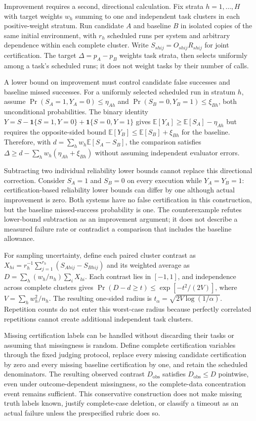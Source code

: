 \documentclass[11pt]{article}
\begin{document}
Improvement requires a second, directional calculation. Fix strata $h=1,\ldots,H$ with target weights $w_h$ summing to one and independent task clusters in each positive-weight stratum. Run candidate $A$ and baseline $B$ in isolated copies of the same initial environment, with $r_h$ scheduled runs per system and arbitrary dependence within each complete cluster. Write $S_{shij}=O_{shij}R_{shij}$ for joint certification. The target $\Delta=p_A-p_B$ weights task strata, then selects uniformly among a task\textquoteright{}s scheduled runs; it does not weight tasks by their number of calls.

A lower bound on improvement must control candidate false successes and baseline missed successes. For a uniformly selected scheduled run in stratum $h$, assume $\Pr(S_A=1,Y_A=0)\leq\eta_{Ah}$ and $\Pr(S_B=0,Y_B=1)\leq\xi_{Bh}$, both unconditional probabilities. The binary identity $Y=S-\mathbf{1}\{S=1,Y=0\}+\mathbf{1}\{S=0,Y=1\}$ gives $\mathbb{E}[Y_A]\geq\mathbb{E}[S_A]-\eta_{Ah}$ but requires the opposite-sided bound $\mathbb{E}[Y_B]\leq\mathbb{E}[S_B]+\xi_{Bh}$ for the baseline. Therefore, with $d=\sum_h w_h\mathbb{E}[S_A-S_B]$, the comparison satisfies $\Delta\geq d-\sum_h w_h(\eta_{Ah}+\xi_{Bh})$ without assuming independent evaluator errors.

Subtracting two individual reliability lower bounds cannot replace this directional correction. Consider $S_A=1$ and $S_B=0$ on every execution while $Y_A=Y_B=1$: certification-based reliability lower bounds can differ by one although actual improvement is zero. Both systems have no false certification in this construction, but the baseline missed-success probability is one. The counterexample refutes lower-bound subtraction as an improvement argument; it does not describe a measured failure rate or contradict a comparison that includes the baseline allowance.

For sampling uncertainty, define each paired cluster contrast as $X_{hi}=r_h^{-1}\sum_{j=1}^{r_h}(S_{Ahij}-S_{Bhij})$ and its weighted average as $D=\sum_h(w_h/n_h)\sum_iX_{hi}$. Each contrast lies in $[-1,1]$, and independence across complete clusters gives $\Pr(D-d\geq t)\leq\exp[-t^2/(2V)]$, where $V=\sum_h w_h^2/n_h$. The resulting one-sided radius is $t_\alpha=\sqrt{2V\log(1/\alpha)}$. Repetition counts do not enter this worst-case radius because perfectly correlated repetitions cannot create additional independent task clusters.

Missing certification labels can be handled without discarding their tasks or assuming that missingness is random. Define complete certification variables through the fixed judging protocol, replace every missing candidate certification by zero and every missing baseline certification by one, and retain the scheduled denominators. The resulting observed contrast $D_{\mathrm{obs}}$ satisfies $D_{\mathrm{obs}}\leq D$ pointwise, even under outcome-dependent missingness, so the complete-data concentration event remains sufficient. This conservative construction does not make missing truth labels known, justify complete-case deletion, or classify a timeout as an actual failure unless the prespecified rubric does so.
\end{document}
